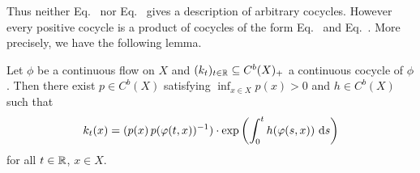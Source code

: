 Thus neither Eq.~ nor Eq.~ gives a description of arbitrary cocycles.
However every positive cocycle is a product of cocycles of the form Eq.~ and Eq.~.
More precisely, we have the following lemma.
\begin{lemma}\label{lem:b2-3.12}
Let $\phi$ be a continuous flow on $X$ and $(k_{t})_{t \in \mathbb{R}} \subseteq C^{b}(X)_{+}$ a continuous cocycle of\/ $\phi$.
Then there exist $p \in C^{b}(X)$ satisfying $\inf_{x \in X} p(x) > 0$ and $h \in C^{b}(X)$ such that
\begin{equation}\label{eq:b2-3.15}
k_{t}(x) = ( p(x) \, p(\phi(t,x))^{-1} ) \cdot \exp\left(\int_{0}^{t} h(\phi(s,x))\, \ds\right)
\end{equation}
for all $t \in \mathbb{R}$, $x \in X$.
\end{lemma}
